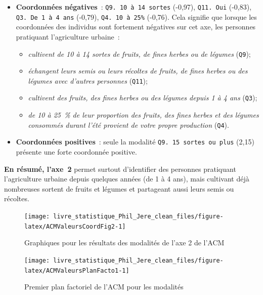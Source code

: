 \documentclass[
  11pt,
  french,
]{book}
\providecommand{\tightlist}{%
  \setlength{\itemsep}{0pt}\setlength{\parskip}{0pt}}
\begin{document}
\begin{itemize}
\tightlist
\item
  \textbf{Coordonnées négatives}~: \texttt{Q9.\ 10\ à\ 14\ sortes} (-0,97), \texttt{Q11.\ Oui} (-0,83), \texttt{Q3.\ De\ 1\ à\ 4\ ans} (-0,79), \texttt{Q4.\ 10\ à\ 25\%} (-0,76). Cela signifie que lorsque les coordonnées des individus sont fortement négatives sur cet axe, les personnes pratiquant l'agriculture urbaine~:

  \begin{itemize}
  \tightlist
  \item
    \emph{cultivent de 10 à 14 sortes de fruits, de fines herbes ou de légumes} (\texttt{Q9});
  \item
    \emph{échangent leurs semis ou leurs récoltes de fruits, de fines herbes ou des légumes avec d'autres personnes} (\texttt{Q11});
  \item
    \emph{cultivent des fruits, des fines herbes ou des légumes depuis 1 à 4 ans} (\texttt{Q3});
  \item
    \emph{de 10 à 25~\% de leur proportion des fruits, des fines herbes et des légumes consommés durant l'été provient de votre propre production }(\texttt{Q4}).
  \end{itemize}
\item
  \textbf{Coordonnées positives}~: seule la modalité \texttt{Q9.\ 15\ sortes\ ou\ plus} (2,15) présente une forte coordonnée positive.
\end{itemize}

\textbf{En résumé, l'axe~2} permet surtout d'identifier des personnes pratiquant l'agriculture urbaine depuis quelques années (de 1 à 4 ans), mais cultivant déjà nombreuses sortent de fruits et légumes et partageant aussi leurs semis ou récoltes.

\begin{figure}

{\centering \texttt{[image: livre\_statistique\_Phil\_Jere\_clean\_files/figure-latex/ACMValeursCoordFig2-1]} 

}

\caption{Graphiques pour les résultats des modalités de l'axe 2 de l'ACM}\label{fig:ACMValeursCoordFig2}
\end{figure}

\begin{figure}

{\centering \texttt{[image: livre\_statistique\_Phil\_Jere\_clean\_files/figure-latex/ACMValeursPlanFacto1-1]} 

}

\caption{Premier plan factoriel de l'ACM pour les modalités}\label{fig:ACMValeursPlanFacto1}
\end{figure}
\end{document}
